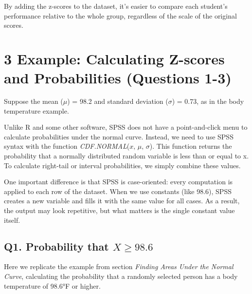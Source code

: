 \documentclass[
  letterpaper,
  DIV=11,
  numbers=noendperiod]{scrreprt}
\begin{document}
By adding the z-scores to the dataset, it's easier to compare each
student's performance relative to the whole group, regardless of the
scale of the original scores.

\section*{3 Example: Calculating Z-scores and Probabilities (Questions
1-3)}\label{example-calculating-z-scores-and-probabilities-questions-1-3}


Suppose the mean (\(\mu\)) = 98.2 and standard deviation (\(\sigma\)) =
0.73, as in the body temperature example.

Unlike R and some other software, SPSS does not have a point-and-click
menu to calculate probabilities under the normal curve. Instead, we need
to use SPSS syntax with the function
\emph{CDF.NORMAL}(\(x,\,\mu,\,\sigma\)). This function returns the
probability that a normally distributed random variable is less than or
equal to x. To calculate right-tail or interval probabilities, we simply
combine these values.

One important difference is that SPSS is case-oriented: every
computation is applied to each row of the dataset. When we use constants
(like 98.6), SPSS creates a new variable and fills it with the same
value for all cases. As a result, the output may look repetitive, but
what matters is the single constant value itself.

\subsection*{\texorpdfstring{Q1. Probability that
\(X \ge 98.6\)}{Q1. Probability that X \textbackslash ge 98.6}}\label{q1.-probability-that-x-ge-98.6}

Here we replicate the example from section \emph{Finding Areas Under the
Normal Curve}, calculating the probability that a randomly selected
person has a body temperature of 98.6°F or higher.
\end{document}

